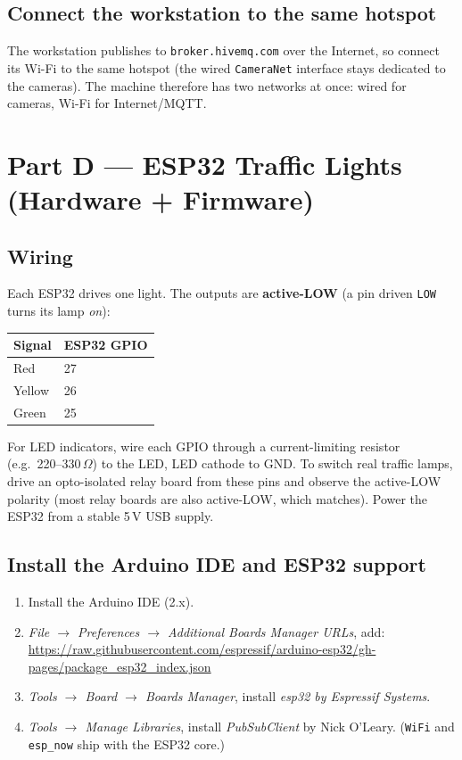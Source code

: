 \documentclass[11pt]{article}
\newcommand{\code}[1]{\texttt{#1}}
\begin{document}
\subsection{Connect the workstation to the same hotspot}
The workstation publishes to \code{broker.hivemq.com} over the Internet, so
connect its Wi-Fi to the same hotspot (the wired \code{CameraNet} interface
stays dedicated to the cameras). The machine therefore has two networks at once:
wired for cameras, Wi-Fi for Internet/MQTT.

\section{Part D --- ESP32 Traffic Lights (Hardware + Firmware)}

\subsection{Wiring}
Each ESP32 drives one light. The outputs are \textbf{active-LOW} (a pin driven
\code{LOW} turns its lamp \emph{on}):

\begin{table}[h]
\centering
\begin{tabular}{@{}ll@{}}
\toprule
\textbf{Signal} & \textbf{ESP32 GPIO} \\
\midrule
Red & 27 \\
Yellow & 26 \\
Green & 25 \\
\bottomrule
\end{tabular}
\end{table}

\noindent For LED indicators, wire each GPIO through a current-limiting resistor
(e.g.\ 220--330\,$\Omega$) to the LED, LED cathode to GND. To switch real
traffic lamps, drive an opto-isolated relay board from these pins and observe
the active-LOW polarity (most relay boards are also active-LOW, which matches).
Power the ESP32 from a stable 5\,V USB supply.

\subsection{Install the Arduino IDE and ESP32 support}
\begin{enumerate}[nosep]
  \item Install the Arduino IDE (2.x).
  \item \emph{File $\rightarrow$ Preferences $\rightarrow$ Additional Boards
        Manager URLs}, add:\\
        \url{https://raw.githubusercontent.com/espressif/arduino-esp32/gh-pages/package_esp32_index.json}
  \item \emph{Tools $\rightarrow$ Board $\rightarrow$ Boards Manager}, install
        \emph{esp32 by Espressif Systems}.
  \item \emph{Tools $\rightarrow$ Manage Libraries}, install \emph{PubSubClient}
        by Nick O'Leary. (\code{WiFi} and \code{esp\_now} ship with the ESP32
        core.)
\end{enumerate}
\end{document}
